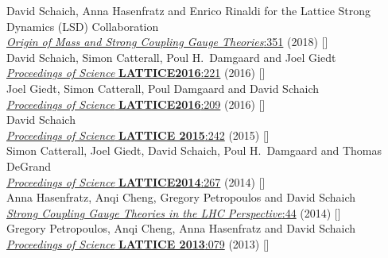 \begin{spacelist}
\begin{revnumerate}
      David Schaich, Anna Hasenfratz and Enrico Rinaldi for the Lattice Strong Dynamics (LSD) Collaboration \\
      \href{https://doi.org/10.1142/9789813231467_0051}{\textit{Origin of Mass and Strong Coupling Gauge Theories}:351} (2018) []
    \pagebreakitem
       \\
      David Schaich, Simon Catterall, Poul H.~Damgaard and Joel Giedt \\
      \href{https://doi.org/10.22323/1.256.0221}{\textit{Proceedings of Science} \textbf{LATTICE2016}:221} (2016) []
    \pagebreakitem
       \\
      Joel Giedt, Simon Catterall, Poul Damgaard and David Schaich \\
      \href{https://doi.org/10.22323/1.256.0209}{\textit{Proceedings of Science} \textbf{LATTICE2016}:209} (2016) []
    \pagebreakitem
       \\
      David Schaich \\
      \href{https://doi.org/10.22323/1.251.0242}{\textit{Proceedings of Science} \textbf{LATTICE 2015}:242} (2015) []
    \pagebreakitem
       \\
      Simon Catterall, Joel Giedt, David Schaich, Poul H.~Damgaard and Thomas DeGrand \\
      \href{https://doi.org/10.22323/1.214.0267}{\textit{Proceedings of Science} \textbf{LATTICE2014}:267} (2014) []
    \pagebreakitem
       \\
      Anna Hasenfratz, Anqi Cheng, Gregory Petropoulos and David Schaich \\
      \href{https://doi.org/10.1142/9789814566254_0004}{\textit{Strong Coupling Gauge Theories in the LHC Perspective}:44} (2014) []
    \pagebreakitem
       \\
      Gregory Petropoulos, Anqi Cheng, Anna Hasenfratz and David Schaich \\
      \href{https://doi.org/10.22323/1.187.0079}{\textit{Proceedings of Science} \textbf{LATTICE 2013}:079} (2013) []
    \pagebreakitem
       \\

\end{revnumerate}
\end{spacelist}
